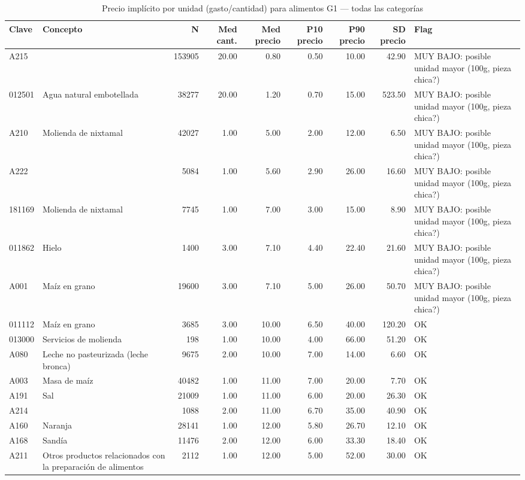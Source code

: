 \begin{table}[ht]
\centering
\caption{Precio impl\'icito por unidad (gasto/cantidad) para alimentos G1 — todas las categor\'ias} 
\label{tab:19a_precio_implicito_todas_categorias}
\begin{tabular}{llrrrrrrl}
  \toprule
Clave & Concepto & N & Med cant. & Med precio & P10 precio & P90 precio & SD precio & Flag \\ 
  \midrule
A215 &  & 153905 & 20.00 & 0.80 & 0.50 & 10.00 & 42.90 & MUY BAJO: posible unidad mayor (100g, pieza chica?) \\ 
  012501 & Agua natural embotellada & 38277 & 20.00 & 1.20 & 0.70 & 15.00 & 523.50 & MUY BAJO: posible unidad mayor (100g, pieza chica?) \\ 
  A210 & Molienda de nixtamal & 42027 & 1.00 & 5.00 & 2.00 & 12.00 & 6.50 & MUY BAJO: posible unidad mayor (100g, pieza chica?) \\ 
  A222 &  & 5084 & 1.00 & 5.60 & 2.90 & 26.00 & 16.60 & MUY BAJO: posible unidad mayor (100g, pieza chica?) \\ 
  181169 & Molienda de nixtamal & 7745 & 1.00 & 7.00 & 3.00 & 15.00 & 8.90 & MUY BAJO: posible unidad mayor (100g, pieza chica?) \\ 
  011862 & Hielo & 1400 & 3.00 & 7.10 & 4.40 & 22.40 & 21.60 & MUY BAJO: posible unidad mayor (100g, pieza chica?) \\ 
  A001 & Maíz en grano & 19600 & 3.00 & 7.10 & 5.00 & 26.00 & 50.70 & MUY BAJO: posible unidad mayor (100g, pieza chica?) \\ 
  011112 & Maíz en grano & 3685 & 3.00 & 10.00 & 6.50 & 40.00 & 120.20 & OK \\ 
  013000 & Servicios de molienda & 198 & 1.00 & 10.00 & 4.00 & 66.00 & 51.20 & OK \\ 
  A080 & Leche no pasteurizada (leche bronca) & 9675 & 2.00 & 10.00 & 7.00 & 14.00 & 6.60 & OK \\ 
  A003 & Masa de maíz & 40482 & 1.00 & 11.00 & 7.00 & 20.00 & 7.70 & OK \\ 
  A191 & Sal & 21009 & 1.00 & 11.00 & 6.00 & 20.00 & 26.30 & OK \\ 
  A214 &  & 1088 & 2.00 & 11.00 & 6.70 & 35.00 & 40.90 & OK \\ 
  A160 & Naranja & 28141 & 1.00 & 12.00 & 5.80 & 26.70 & 12.10 & OK \\ 
  A168 & Sandía & 11476 & 2.00 & 12.00 & 6.00 & 33.30 & 18.40 & OK \\ 
  A211 & Otros productos relacionados con la preparación de alimentos & 2112 & 1.00 & 12.00 & 5.00 & 52.00 & 30.00 & OK \\ 

\end{tabular}
\end{table}
